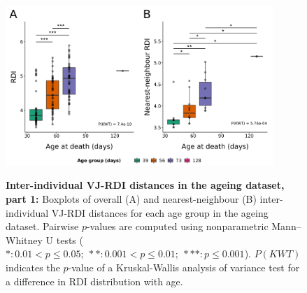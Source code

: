 \begin{figure}
\centering
\includegraphics[width = 0.9\textwidth]{_Figures/png/ageing-rdi-VJ-individual-groupdist}
\begin{subfigure}{0em}
\label{fig:igseq-ageing-rdi-VJ-individual-groupdist-all}
\end{subfigure}
\begin{subfigure}{0em}
\label{fig:igseq-ageing-rdi-VJ-individual-groupdist-nn}
\end{subfigure}
\caption[Inter-individual VJ-RDI distances in the \igseq ageing dataset, part 1]{\textbf{Inter-individual VJ-RDI distances in the \igseq ageing dataset, part 1:} Boxplots of overall (A) and nearest-neighbour (B) inter-individual VJ-RDI distances for each age group in the \igseq ageing dataset. Pairwise $p$-values are computed using nonparametric Mann–Whitney U tests ($*: 0.01 < p \leq 0.05;~**: 0.001 < p \leq 0.01;~***: p \leq 0.001$). $P(KWT)$ indicates the $p$-value of a Kruskal-Wallis analysis of variance test for a difference in RDI distribution with age.}
\label{fig:igseq-ageing-rdi-VJ-individual-groupdist}
\end{figure}

